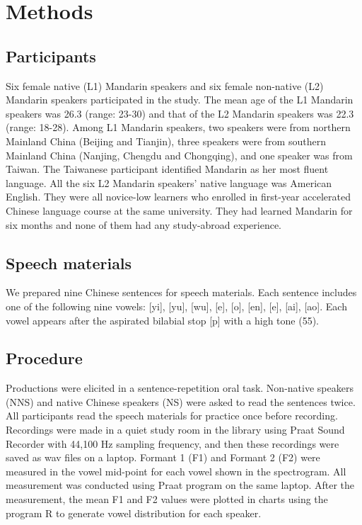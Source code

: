 \documentclass[man, fleqn, noextraspace]{apa6}
\begin{document}
\section{Methods}\label{methods}

\subsection{Participants}\label{participants}

Six female native (L1) Mandarin speakers and six female non-native (L2)
Mandarin speakers participated in the study. The mean age of the L1
Mandarin speakers was 26.3 (range: 23-30) and that of the L2 Mandarin
speakers was 22.3 (range: 18-28). Among L1 Mandarin speakers, two
speakers were from northern Mainland China (Beijing and Tianjin), three
speakers were from southern Mainland China (Nanjing, Chengdu and
Chongqing), and one speaker was from Taiwan. The Taiwanese participant
identified Mandarin as her most fluent language. All the six L2 Mandarin
speakers' native language was American English. They were all novice-low
learners who enrolled in first-year accelerated Chinese language course
at the same university. They had learned Mandarin for six months and
none of them had any study-abroad experience.

\subsection{Speech materials}\label{speech-materials}

We prepared nine Chinese sentences for speech materials. Each sentence
includes one of the following nine vowels: {[}yi{]}, {[}yu{]}, {[}wu{]},
{[}e{]}, {[}o{]}, {[}en{]}, {[}e{]}, {[}ai{]}, {[}ao{]}. Each vowel
appears after the aspirated bilabial stop {[}p{]} with a high tone (55).

\subsection{Procedure}\label{procedure}

Productions were elicited in a sentence-repetition oral task. Non-native
speakers (NNS) and native Chinese speakers (NS) were asked to read the
sentences twice. All participants read the speech materials for practice
once before recording. Recordings were made in a quiet study room in the
library using Praat Sound Recorder with 44,100 Hz sampling frequency,
and then these recordings were saved as wav files on a laptop. Formant 1
(F1) and Formant 2 (F2) were measured in the vowel mid-point for each
vowel shown in the spectrogram. All measurement was conducted using
Praat program on the same laptop. After the measurement, the mean F1 and
F2 values were plotted in charts using the program R to generate vowel
distribution for each speaker.
\end{document}
